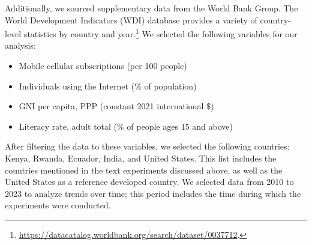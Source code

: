 \documentclass[12pt]{article}
\begin{document}
Additionally, we sourced supplementary data from the World Bank Group. The World Development Indicators (WDI) database provides a variety of country-level statistics by country and year.\footnote{\url{https://datacatalog.worldbank.org/search/dataset/0037712}.} We selected the following variables for our analysis:
\begin{itemize}
    \singlespacing
    \item Mobile cellular subscriptions (per 100 people)
    \item Individuals using the Internet (\% of population)
    \item GNI per capita, PPP (constant 2021 international \$)
    \item Literacy rate, adult total (\% of people ages 15 and above)
\end{itemize}
After filtering the data to these variables, we selected the following countries: Kenya, Rwanda, Ecuador, India, and United States. This list includes the countries mentioned in the text experiments discussed above, as well as the United States as a reference developed country. We selected data from 2010 to 2023 to analyze trends over time; this period includes the time during which the \textcite{fabregas_digital_2025} experiments were conducted.
\end{document}
